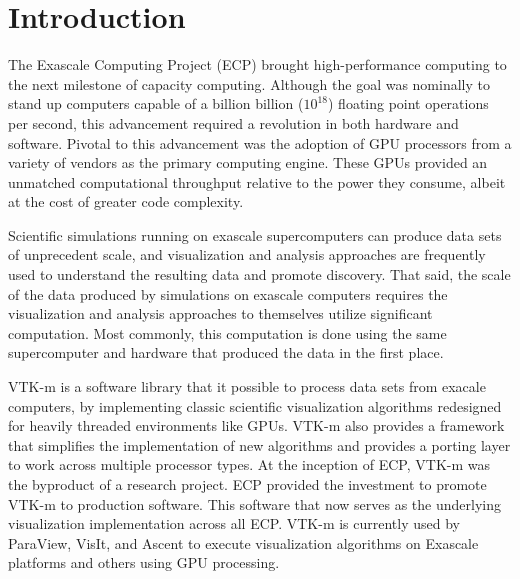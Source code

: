 


\section{Introduction}




The Exascale Computing Project (ECP) brought high-performance computing to the next milestone of capacity computing.
Although the goal was nominally to stand up computers capable of a billion billion ($10^{18}$) floating point operations per second, this advancement required a revolution in both hardware and software.
Pivotal to this advancement was the adoption of GPU processors from a variety of vendors as the primary computing engine.
These GPUs provided an unmatched computational throughput relative to the power they consume, albeit at the cost of greater code complexity.

Scientific simulations running on exascale supercomputers can produce data sets of unprecedent
scale, and
visualization and analysis approaches are frequently used to understand the resulting
data and promote discovery.
%
That said, the scale of the data produced by simulations on exascale computers requires
the visualization and analysis approaches to themselves utilize significant computation.
%
Most commonly, this computation is done using the same supercomputer and hardware that produced
the data in the first place.

VTK-m is a software library that it possible to process data sets from exacale computers,
 by implementing classic scientific visualization algorithms redesigned for heavily threaded environments like GPUs.
VTK-m also provides a framework that simplifies the implementation of new algorithms and provides a porting layer to work across multiple processor types.
At the inception of ECP, VTK-m was the byproduct of a research project.
ECP provided the investment to promote VTK-m to production software.
This software that now serves as the underlying visualization implementation across all ECP.
VTK-m is currently used by ParaView, VisIt, and Ascent to execute visualization algorithms on Exascale platforms and others using GPU processing.

